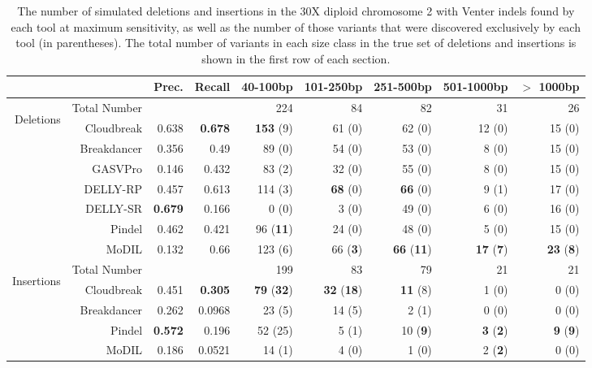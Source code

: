 \documentclass[11pt]{article}
\begin{document}
\begin{table}[t]
\begin{center}
\begin{tabular}{r|rrr|rrrrr}
  \cline{2-9}
   &                     & Prec. & Recall & 40-100bp  & 101-250bp  & 251-500bp & 501-1000bp & $>$ 1000bp \\ 
\hline
\multirow{7}{*}{\begin{sideways}Deletions\end{sideways}} & Total Number &          &           & 224 &  84 & 82 &  31 & 26\\ 
  \hline
\cline{2-9}
&  Cloudbreak    &  0.638 & \textbf{0.678} & \textbf{153} (9)  & 61 (0) &  62 (0) & 12 (0) & 15 (0) \\ 
&  Breakdancer   &  0.356 & 0.49 & 89 (0)  & 54 (0) &  53 (0) & 8 (0) & 15 (0) \\ 
&  GASVPro        & 0.146 & 0.432 & 83 (2)  & 32 (0) &  55 (0) & 8 (0) & 15 (0) \\ 
&  DELLY-RP           & 0.457 & 0.613 & 114 (3)  & \textbf{68} (0) &  \textbf{66} (0) & 9 (1) & 17 (0) \\ 
&  DELLY-SR           & \textbf{0.679} & 0.166 & 0 (0)  & 3 (0) &  49 (0) & 6 (0) & 16 (0) \\ 
&  Pindel           & 0.462 & 0.421 & 96 (\textbf{11})  & 24 (0) &  48 (0) & 5 (0) & 15 (0)\\ 
&  MoDIL           & 0.132  & 0.66 & 123 (6)  & 66 (\textbf{3}) &  \textbf{66} (\textbf{11}) & \textbf{17} (\textbf{7}) & \textbf{23} (\textbf{8})\\ 
   \hline
\multirow{5}{*}{\begin{sideways}Insertions\end{sideways}} & Total Number &          &           & 199 &  83 & 79 &  21 & 21\\ 
\cline{2-9}
&  Cloudbreak   &0.451 & \textbf{0.305}  & \textbf{79} (\textbf{32})  & \textbf{32} (\textbf{18}) &  \textbf{11} (8) & 1 (0) & 0 (0) \\ 
&  Breakdancer & 0.262 & 0.0968  & 23 (5)  & 14 (5) &  2 (1) & 0 (0) & 0 (0) \\ 
&  Pindel          & \textbf{0.572} & 0.196 & 52 (25)  & 5 (1) &  10 (\textbf{9}) & \textbf{3} (\textbf{2}) & \textbf{9} (\textbf{9})\\ 
&  MoDIL          & 0.186 & 0.0521 & 14 (1)  & 4 (0) &  1 (0) & 2 (\textbf{2}) & 0 (0)\\ 
\hline
\end{tabular}
\end{center}
\caption{The number of simulated deletions and insertions in the 30X diploid chromosome 2 with Venter indels found by each tool at maximum sensitivity, as well as the number of those variants that were discovered exclusively by each tool (in parentheses). The total number of variants in each size class in the true set of deletions and insertions is shown in the first row of each section.}
\label{chr2DeletionAndInsertionPredsMaxSensitivity}
\end{table}
\end{document}
